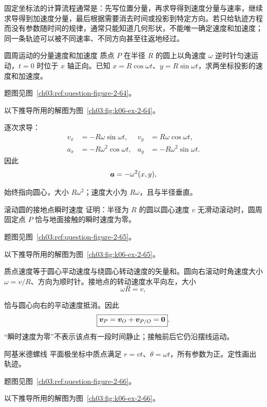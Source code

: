 {固定坐标法的计算流程通常是：先写位置分量，再求导得到速度分量与速率，继续求导得到加速度分量，最后根据需要消去时间或投影到特定方向。若只给轨迹方程而没有参数随时间的规律，通常只能知道几何形状，不能唯一确定速度和加速度；同一条轨迹可以被不同速率、不同方向甚至往返地经过。


\begin{origexamplebox}{圆周运动的分量速度和加速度}\label{ch03:ex:k06-2-64}
质点 $P$ 在半径 $R$ 的圆上以角速度 $\omega$ 逆时针匀速运动，$t=0$ 时位于 $x$ 轴正向。已知 $x=R\cos\omega t$、$y=R\sin\omega t$，求两坐标投影的速度和加速度。
\par 题图见图~\ref{ch03:ref:question-figure-2-64}。
\KQuestionCM
\end{origexamplebox}
\begin{xesolution}
以下推导所用的解图为图~\ref{ch03:fig:k06-ex-2-64}。

逐次求导：
\begin{align*}
v_x&=-R\omega\sin\omega t,&v_y&=R\omega\cos\omega t,\\
a_x&=-R\omega^2\cos\omega t,&a_y&=-R\omega^2\sin\omega t.
\end{align*}
因此
\[
\bm{a}=-\omega^2(x,y),
\]
\CircleComponentsDiagram

始终指向圆心，大小 $R\omega^2$；速度大小为 $R\omega$，且与半径垂直。
\end{xesolution}

\begin{origexamplebox}{滚动圆的接地点瞬时速度}\label{ch03:ex:k06-2-65}
证明：半径为 $R$ 的圆以圆心速度 $v$ 无滑动滚动时，圆周固定点 $P$ 恰与地面接触的瞬时速度为零。
\par 题图见图~\ref{ch03:ref:question-figure-2-65}。
\KQuestionCN
\end{origexamplebox}
\begin{xesolution}
以下推导所用的解图为图~\ref{ch03:fig:k06-ex-2-65}。

质点速度等于圆心平动速度与绕圆心转动速度的矢量和。圆向右滚动时角速度大小 $\omega=v/R$、方向为顺时针。接地点的转动速度水平向左，大小
\[
\omega R=v,
\]
\RollingContactDiagram

恰与圆心向右的平动速度抵消。因此
\[
 \boxed{\bm{v}_P=\bm{v}_O+\bm{v}_{P/O}=\bm{0}}.
\]
“瞬时速度为零”不表示该点有一段时间静止；接触前后它仍沿摆线运动。
\end{xesolution}

\begin{origexamplebox}{阿基米德螺线}\label{ch03:ex:k06-2-66}
平面极坐标中质点满足 $r=vt$、$\theta=\omega t$，所有参数为正。定性画出轨迹。
\par 题图见图~\ref{ch03:ref:question-figure-2-66}。
\KQuestionCO
\end{origexamplebox}
\begin{xesolution}
以下推导所用的解图为图~\ref{ch03:fig:k06-ex-2-66}。


\end{xesolution}}
